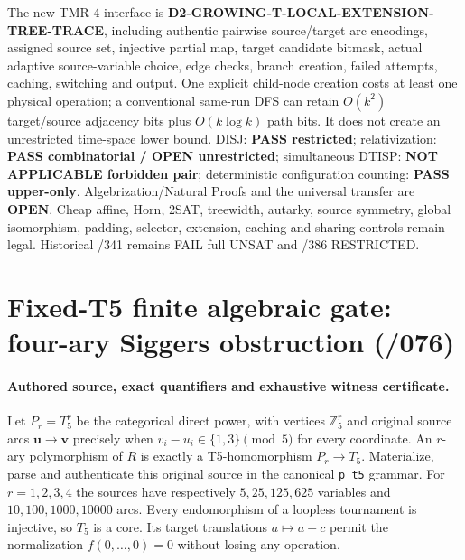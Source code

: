 \documentclass[11pt]{article}
\begin{document}
The new TMR-4 interface is
\textbf{D2-GROWING-T-LOCAL-EXTENSION-TREE-TRACE},
including authentic pairwise source/target arc encodings,
assigned source set, injective partial map, target candidate
bitmask, actual adaptive source-variable choice, edge checks,
branch creation, failed attempts, caching, switching and output.
One explicit child-node creation costs at least one physical
operation; a conventional same-run DFS can retain $O(k^2)$
target/source adjacency bits plus $O(k\log k)$ path bits.
It does not create an unrestricted time-space lower bound.
DISJ: \textbf{PASS restricted}; relativization:
\textbf{PASS combinatorial / OPEN unrestricted};
simultaneous DTISP: \textbf{NOT APPLICABLE forbidden pair};
deterministic configuration counting: \textbf{PASS upper-only}.
Algebrization/Natural Proofs and the universal transfer are
\textbf{OPEN}. Cheap affine, Horn, 2SAT, treewidth,
autarky, source symmetry, global isomorphism, padding,
selector, extension, caching and sharing controls remain legal.
Historical /341 remains FAIL full UNSAT and /386 RESTRICTED.

\section{Fixed-T5 finite algebraic gate: four-ary Siggers obstruction (/076)}
\paragraph{Authored source, exact quantifiers and exhaustive witness certificate.}
Let $P_r=T_5^r$ be the categorical direct power, with
vertices $\mathbb Z_5^r$ and original source arcs
$\mathbf u\to\mathbf v$ precisely when
$v_i-u_i\in\{1,3\}\pmod5$ for every coordinate.
An $r$-ary polymorphism of $R$ is exactly a T5-homomorphism
$P_r\to T_5$. Materialize, parse and authenticate this original
source in the canonical \texttt{p t5} grammar. For $r=1,2,3,4$
the sources have respectively $5,25,125,625$ variables and
$10,100,1000,10000$ arcs. Every endomorphism of a loopless
tournament is injective, so $T_5$ is a core. Its target
translations $a\mapsto a+c$ permit the normalization
$f(0,\ldots,0)=0$ without losing any operation.
\end{document}
